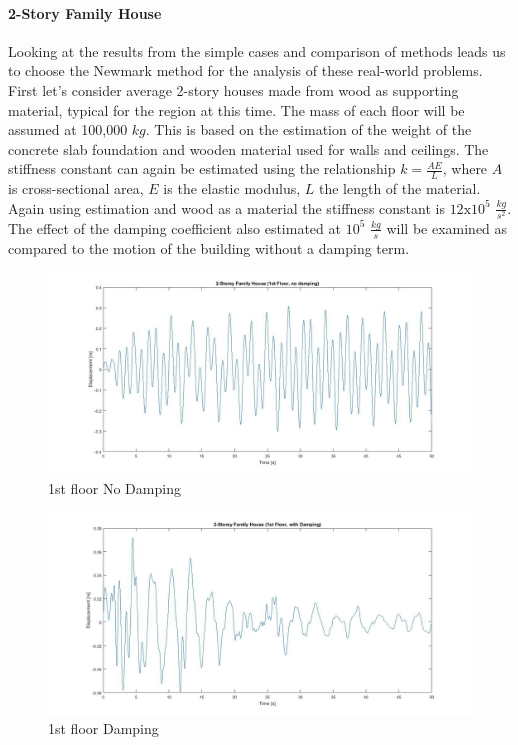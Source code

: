 \documentclass{article}
\begin{document}
	\paragraph{2-Story Family House} Looking at the results from the simple cases and comparison of methods leads us to choose the Newmark method for the analysis of these real-world problems. First let's consider average 2-story houses made from wood as supporting material, typical for the region at this time. The mass of each floor will be assumed at 100,000 $kg$. This is based on the estimation of the weight of the concrete slab foundation and wooden material used for walls and ceilings. The stiffness constant can again be estimated using the relationship $k = \frac{AE}{L}$, where $A$ is cross-sectional area, $E$ is the elastic modulus, $L$ the length of the material. Again using estimation and wood as a material the stiffness constant is $12\text{x}10^5$ $\frac{kg}{s^2}$. The effect of the damping coefficient also estimated at $10^5$ $\frac{kg}{s}$ will be examined as compared to the motion of the building without a damping term. 

				\begin{figure}[h!]
   					\centering
   					\includegraphics[width=142mm]{pictures/FM1.jpg}
					\caption{1st floor No Damping}
					\label{FM1}
  				\end{figure}

				\begin{figure}[h!]
   					\centering
					\includegraphics[width=142mm]{pictures/FMD1.jpg}
					\caption{1st floor Damping}
					\label{FMD1}
  				\end{figure}
\end{document}
